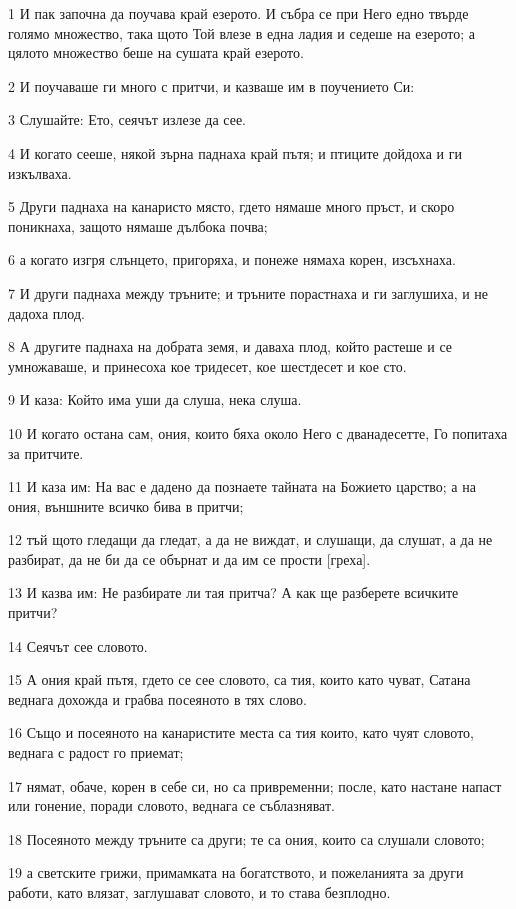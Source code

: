 \par 1 И пак започна да поучава край езерото. И събра се при Него едно твърде голямо множество, така щото Той влезе в една ладия и седеше на езерото; а цялото множество беше на сушата край езерото.
\par 2 И поучаваше ги много с притчи, и казваше им в поучението Си:
\par 3 Слушайте: Ето, сеячът излезе да сее.
\par 4 И когато сееше, някой зърна паднаха край пътя; и птиците дойдоха и ги изкълваха.
\par 5 Други паднаха на канаристо място, гдето нямаше много пръст, и скоро поникнаха, защото нямаше дълбока почва;
\par 6 а когато изгря слънцето, пригоряха, и понеже нямаха корен, изсъхнаха.
\par 7 И други паднаха между тръните; и тръните порастнаха и ги заглушиха, и не дадоха плод.
\par 8 А другите паднаха на добрата земя, и даваха плод, който растеше и се умножаваше, и принесоха кое тридесет, кое шестдесет и кое сто.
\par 9 И каза: Който има уши да слуша, нека слуша.
\par 10 И когато остана сам, ония, които бяха около Него с дванадесетте, Го попитаха за притчите.
\par 11 И каза им: На вас е дадено да познаете тайната на Божието царство; а на ония, външните всичко бива в притчи;
\par 12 тъй щото гледащи да гледат, а да не виждат, и слушащи, да слушат, а да не разбират, да не би да се обърнат и да им се прости [греха].
\par 13 И казва им: Не разбирате ли тая притча? А как ще разберете всичките притчи?
\par 14 Сеячът сее словото.
\par 15 А ония край пътя, гдето се сее словото, са тия, които като чуват, Сатана веднага дохожда и грабва посеяното в тях слово.
\par 16 Също и посеяното на канаристите места са тия които, като чуят словото, веднага с радост го приемат;
\par 17 нямат, обаче, корен в себе си, но са привременни; после, като настане напаст или гонение, поради словото, веднага се съблазняват.
\par 18 Посеяното между тръните са други; те са ония, които са слушали словото;
\par 19 а светските грижи, примамката на богатството, и пожеланията за други работи, като влязат, заглушават словото, и то става безплодно.

